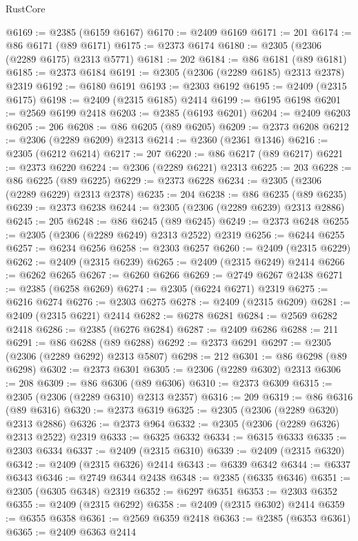 \begin{lexlean}{RustCore}
\begin{coremodule}
@6169 := @2385 (@6159 @6167)
@6170 := @2409 @6169
@6171 := 201
@6174 := @86 @6171 (@89 @6171)
@6175 := @2373 @6174
@6180 := @2305 (@2306 (@2289 @6175) @2313 @5771)
@6181 := 202
@6184 := @86 @6181 (@89 @6181)
@6185 := @2373 @6184
@6191 := @2305 (@2306 (@2289 @6185) @2313 @2378) @2319
@6192 := @6180 @6191
@6193 := @2303 @6192
@6195 := @2409 (@2315 @6175)
@6198 := @2409 (@2315 @6185) @2414
@6199 := @6195 @6198
@6201 := @2569 @6199 @2418
@6203 := @2385 (@6193 @6201)
@6204 := @2409 @6203
@6205 := 206
@6208 := @86 @6205 (@89 @6205)
@6209 := @2373 @6208
@6212 := @2306 (@2289 @6209) @2313
@6214 := @2360 (@2361 @1346)
@6216 := @2305 (@6212 @6214)
@6217 := 207
@6220 := @86 @6217 (@89 @6217)
@6221 := @2373 @6220
@6224 := @2306 (@2289 @6221) @2313
@6225 := 203
@6228 := @86 @6225 (@89 @6225)
@6229 := @2373 @6228
@6234 := @2305 (@2306 (@2289 @6229) @2313 @2378)
@6235 := 204
@6238 := @86 @6235 (@89 @6235)
@6239 := @2373 @6238
@6244 := @2305 (@2306 (@2289 @6239) @2313 @2886)
@6245 := 205
@6248 := @86 @6245 (@89 @6245)
@6249 := @2373 @6248
@6255 := @2305 (@2306 (@2289 @6249) @2313 @2522) @2319
@6256 := @6244 @6255
@6257 := @6234 @6256
@6258 := @2303 @6257
@6260 := @2409 (@2315 @6229)
@6262 := @2409 (@2315 @6239)
@6265 := @2409 (@2315 @6249) @2414
@6266 := @6262 @6265
@6267 := @6260 @6266
@6269 := @2749 @6267 @2438
@6271 := @2385 (@6258 @6269)
@6274 := @2305 (@6224 @6271) @2319
@6275 := @6216 @6274
@6276 := @2303 @6275
@6278 := @2409 (@2315 @6209)
@6281 := @2409 (@2315 @6221) @2414
@6282 := @6278 @6281
@6284 := @2569 @6282 @2418
@6286 := @2385 (@6276 @6284)
@6287 := @2409 @6286
@6288 := 211
@6291 := @86 @6288 (@89 @6288)
@6292 := @2373 @6291
@6297 := @2305 (@2306 (@2289 @6292) @2313 @5807)
@6298 := 212
@6301 := @86 @6298 (@89 @6298)
@6302 := @2373 @6301
@6305 := @2306 (@2289 @6302) @2313
@6306 := 208
@6309 := @86 @6306 (@89 @6306)
@6310 := @2373 @6309
@6315 := @2305 (@2306 (@2289 @6310) @2313 @2357)
@6316 := 209
@6319 := @86 @6316 (@89 @6316)
@6320 := @2373 @6319
@6325 := @2305 (@2306 (@2289 @6320) @2313 @2886)
@6326 := @2373 @964
@6332 := @2305 (@2306 (@2289 @6326) @2313 @2522) @2319
@6333 := @6325 @6332
@6334 := @6315 @6333
@6335 := @2303 @6334
@6337 := @2409 (@2315 @6310)
@6339 := @2409 (@2315 @6320)
@6342 := @2409 (@2315 @6326) @2414
@6343 := @6339 @6342
@6344 := @6337 @6343
@6346 := @2749 @6344 @2438
@6348 := @2385 (@6335 @6346)
@6351 := @2305 (@6305 @6348) @2319
@6352 := @6297 @6351
@6353 := @2303 @6352
@6355 := @2409 (@2315 @6292)
@6358 := @2409 (@2315 @6302) @2414
@6359 := @6355 @6358
@6361 := @2569 @6359 @2418
@6363 := @2385 (@6353 @6361)
@6365 := @2409 @6363 @2414

\end{coremodule}
\end{lexlean}
